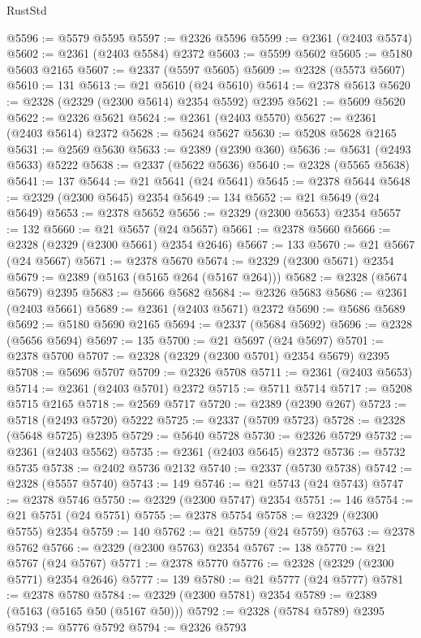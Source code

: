 \begin{lexlean}{RustStd}
\begin{coremodule}
{\begin{coremodule}
{{{{{{{{{{{{{{{{{{{{{{{{{{{{{{{{{{{{{@5596 := @5579 @5595
@5597 := @2326 @5596
@5599 := @2361 (@2403 @5574)
@5602 := @2361 (@2403 @5584) @2372
@5603 := @5599 @5602
@5605 := @5180 @5603 @2165
@5607 := @2337 (@5597 @5605)
@5609 := @2328 (@5573 @5607)
@5610 := 131
@5613 := @21 @5610 (@24 @5610)
@5614 := @2378 @5613
@5620 := @2328 (@2329 (@2300 @5614) @2354 @5592) @2395
@5621 := @5609 @5620
@5622 := @2326 @5621
@5624 := @2361 (@2403 @5570)
@5627 := @2361 (@2403 @5614) @2372
@5628 := @5624 @5627
@5630 := @5208 @5628 @2165
@5631 := @2569 @5630
@5633 := @2389 (@2390 @360)
@5636 := @5631 (@2493 @5633) @5222
@5638 := @2337 (@5622 @5636)
@5640 := @2328 (@5565 @5638)
@5641 := 137
@5644 := @21 @5641 (@24 @5641)
@5645 := @2378 @5644
@5648 := @2329 (@2300 @5645) @2354
@5649 := 134
@5652 := @21 @5649 (@24 @5649)
@5653 := @2378 @5652
@5656 := @2329 (@2300 @5653) @2354
@5657 := 132
@5660 := @21 @5657 (@24 @5657)
@5661 := @2378 @5660
@5666 := @2328 (@2329 (@2300 @5661) @2354 @2646)
@5667 := 133
@5670 := @21 @5667 (@24 @5667)
@5671 := @2378 @5670
@5674 := @2329 (@2300 @5671) @2354
@5679 := @2389 (@5163 (@5165 @264 (@5167 @264)))
@5682 := @2328 (@5674 @5679) @2395
@5683 := @5666 @5682
@5684 := @2326 @5683
@5686 := @2361 (@2403 @5661)
@5689 := @2361 (@2403 @5671) @2372
@5690 := @5686 @5689
@5692 := @5180 @5690 @2165
@5694 := @2337 (@5684 @5692)
@5696 := @2328 (@5656 @5694)
@5697 := 135
@5700 := @21 @5697 (@24 @5697)
@5701 := @2378 @5700
@5707 := @2328 (@2329 (@2300 @5701) @2354 @5679) @2395
@5708 := @5696 @5707
@5709 := @2326 @5708
@5711 := @2361 (@2403 @5653)
@5714 := @2361 (@2403 @5701) @2372
@5715 := @5711 @5714
@5717 := @5208 @5715 @2165
@5718 := @2569 @5717
@5720 := @2389 (@2390 @267)
@5723 := @5718 (@2493 @5720) @5222
@5725 := @2337 (@5709 @5723)
@5728 := @2328 (@5648 @5725) @2395
@5729 := @5640 @5728
@5730 := @2326 @5729
@5732 := @2361 (@2403 @5562)
@5735 := @2361 (@2403 @5645) @2372
@5736 := @5732 @5735
@5738 := @2402 @5736 @2132
@5740 := @2337 (@5730 @5738)
@5742 := @2328 (@5557 @5740)
@5743 := 149
@5746 := @21 @5743 (@24 @5743)
@5747 := @2378 @5746
@5750 := @2329 (@2300 @5747) @2354
@5751 := 146
@5754 := @21 @5751 (@24 @5751)
@5755 := @2378 @5754
@5758 := @2329 (@2300 @5755) @2354
@5759 := 140
@5762 := @21 @5759 (@24 @5759)
@5763 := @2378 @5762
@5766 := @2329 (@2300 @5763) @2354
@5767 := 138
@5770 := @21 @5767 (@24 @5767)
@5771 := @2378 @5770
@5776 := @2328 (@2329 (@2300 @5771) @2354 @2646)
@5777 := 139
@5780 := @21 @5777 (@24 @5777)
@5781 := @2378 @5780
@5784 := @2329 (@2300 @5781) @2354
@5789 := @2389 (@5163 (@5165 @50 (@5167 @50)))
@5792 := @2328 (@5784 @5789) @2395
@5793 := @5776 @5792
@5794 := @2326 @5793
}}}}}}}}}}}}}}}}}}}}}}}}}}}}}}}}}}}}}
\end{coremodule}}
\end{coremodule}
\end{lexlean}
